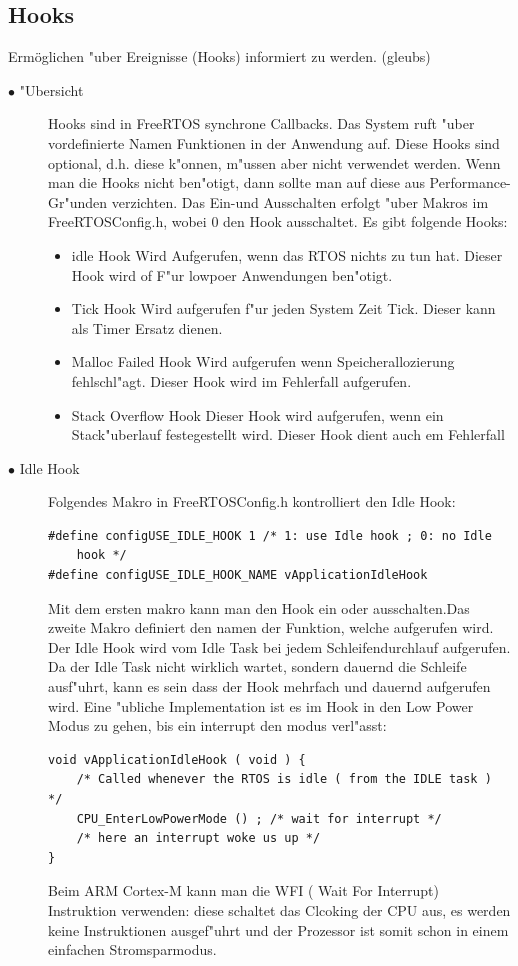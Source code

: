 \documentclass[a4paper, 8pt]{extarticle}
\begin{document}
\begin{multicols*}{3}
				\subsection{Hooks}
				Ermöglichen "uber Ereignisse (Hooks) informiert zu werden. (gleubs)
				\begin{description}
					\item[$\bullet$ "Ubersicht]
						Hooks sind in FreeRTOS synchrone Callbacks. Das System ruft "uber vordefinierte Namen Funktionen in der Anwendung auf.
						Diese Hooks sind optional, d.h. diese k"onnen, m"ussen aber nicht verwendet werden. Wenn man die 
						Hooks nicht ben"otigt, dann sollte man auf diese aus Performance-Gr"unden verzichten. Das Ein-und Ausschalten erfolgt "uber
						Makros im FreeRTOSConfig.h, wobei 0 den Hook ausschaltet. Es gibt folgende Hooks: 
						\begin{itemize}
							\item idle Hook
								Wird Aufgerufen, wenn das RTOS nichts zu tun hat. Dieser Hook wird of F"ur lowpoer Anwendungen ben"otigt.
							\item Tick Hook
								Wird aufgerufen f"ur jeden System Zeit Tick. Dieser kann als Timer Ersatz dienen.
							\item Malloc Failed Hook
								Wird aufgerufen wenn Speicherallozierung fehlschl"agt. Dieser Hook wird im Fehlerfall aufgerufen.
							\item Stack Overflow Hook
								Dieser Hook wird aufgerufen, wenn ein Stack"uberlauf festegestellt wird.
								Dieser Hook dient auch em Fehlerfall
						\end{itemize}
					\item[$\bullet$ Idle Hook]
						Folgendes Makro in FreeRTOSConfig.h kontrolliert den Idle Hook:
						\begin{lstlisting}
#define configUSE_IDLE_HOOK 1 /* 1: use Idle hook ; 0: no Idle
	hook */
#define configUSE_IDLE_HOOK_NAME vApplicationIdleHook
						\end{lstlisting}
							Mit dem ersten makro kann man den Hook ein oder ausschalten.Das zweite Makro definiert den namen der Funktion, welche aufgerufen wird.
							Der Idle Hook wird vom Idle Task bei jedem Schleifendurchlauf aufgerufen.
							Da der Idle Task nicht wirklich wartet, sondern dauernd die Schleife ausf"uhrt, kann es sein dass der Hook mehrfach und dauernd aufgerufen wird.
							Eine "ubliche Implementation ist es im Hook in den Low Power Modus zu gehen, bis ein interrupt den modus verl"asst:
						\begin{lstlisting}
void vApplicationIdleHook ( void ) {
	/* Called whenever the RTOS is idle ( from the IDLE task ) */
	CPU_EnterLowPowerMode () ; /* wait for interrupt */
	/* here an interrupt woke us up */
}
						\end{lstlisting}
						Beim ARM Cortex-M kann man die WFI ( Wait For Interrupt) Instruktion verwenden: 
						diese schaltet das Clcoking der CPU aus, es werden keine Instruktionen ausgef"uhrt und der Prozessor ist somit schon
						in einem einfachen Stromsparmodus.


\end{description}
\end{multicols*}
\end{document}

